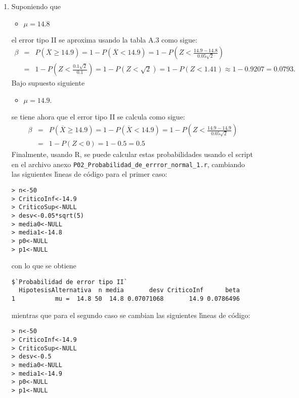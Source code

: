 \begin{solucion}
\begin{enumerate}
  \item Suponiendo que
  \begin{itemize}
   \item $\mu = 14.8$
  \end{itemize}
  el error tipo II se aproxima usando la tabla A.3 como sigue:
  \begin{eqnarray*}
   \beta & = & P\left(\overline{X} \geq 14.9\right) = 1 - P\left(\overline{X} < 14.9\right) = 1 - P\left( Z < \frac{14.9-14.8}{0.05\sqrt{2}} \right) \\
   & = & 1 - P\left( Z < \frac{0.1\sqrt{2}}{0.1} \right) = 1 - P\left( Z < \sqrt{2} \right) = 1 - P(Z < 1.41) \approx 1 - 0.9207 = 0.0793.
  \end{eqnarray*}
  Bajo supuesto siguiente
  \begin{itemize}
   \item $\mu = 14.9$.
  \end{itemize}
  se tiene ahora que el error tipo II se calcula como sigue:
  \begin{eqnarray*}
   \beta & = & P\left(\overline{X} \geq 14.9\right) = 1 - P\left(\overline{X} < 14.9\right) = 1 - P\left( Z < \frac{14.9-14.9}{0.05\sqrt{2}} \right) \\
   & = & 1 - P(Z < 0) = 1 - 0.5 = 0.5
  \end{eqnarray*}
  Finalmente, usando R, se puede calcular estas probabilidades usando el script en el archivo anexo \texttt{P02\_Probabilidad\_de\_errror\_normal\_1.r}, cambiando las siguientes l\'{\i}neas de c\'odigo para el primer caso:
  \begin{verbatim}
> n<-50
> CriticoInf<-14.9
> CriticoSup<-NULL
> desv<-0.05*sqrt(5)
> media0<-NULL
> media1<-14.8
> p0<-NULL
> p1<-NULL
  \end{verbatim}
  \vspace{-0.5cm}
  con lo que se obtiene
  \begin{verbatim}
$`Probabilidad de error tipo II`
  HipotesisAlternativa  n media       desv CriticoInf      beta
1           mu =  14.8 50  14.8 0.07071068       14.9 0.0786496
  \end{verbatim}
  \vspace{-0.5cm}
  mientras que para el segundo caso se cambian las siguientes l\'{\i}neas de c\'odigo:
  \begin{verbatim}
> n<-50
> CriticoInf<-14.9
> CriticoSup<-NULL
> desv<-0.5
> media0<-NULL
> media1<-14.9
> p0<-NULL
> p1<-NULL
  \end{verbatim}
  \vspace{-0.5cm}

\end{enumerate}
\end{solucion}
